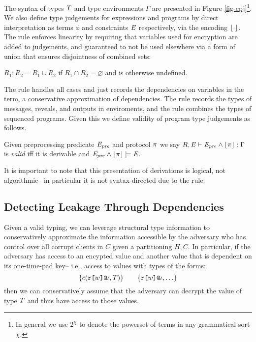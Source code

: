 \cpjfig

The syntax of types $T$ and type environments $\Gamma$ are presented
in Figure \ref{fig-cpj}\footnote{In general we use $2^{\chi}$ to
denote the powerset of terms in any grammatical sort $\chi$.}. We also
define type judgements for expressions and programs by direct
interpretation as terms $\phi$ and constraints $\mathit{E}$ respectively,
via the encoding $\lfloor \cdot \rfloor$. The  rule enforces
linearity by requiring that variables used for encryption are added to
judgements, and guaranteed to not be used elsewhere via a form of
union that ensures disjointness of combined sets:
\begin{definition}
  $R_1;R_2 = R_1 \cup R_2$ if $R_1 \cap R_2 = \varnothing$ and is otherwise
  undefined.
\end{definition}
The  rule handles all cases and just records the
dependencies on variables in the term, a conservative approximation of
dependencies.  The  rule records the types of messages,
reveals, and outputs in enviroments, and the  rule
combines the types of sequenced programs.  Given this we define
validity of program type judgements as follows.
\begin{definition}
  Given preprocessing predicate $\mathit{E}_{\mathit{pre}}$ and protocol $\pi$ we say
  $R,\mathit{E} \vdash \mathit{E}_{\mathit{pre}} \wedge \lfloor \pi \rfloor : \Gamma$ is \emph{valid} iff it is derivable and
  $\mathit{E}_{\mathit{pre}} \wedge \lfloor \pi \rfloor \models \mathit{E}$.
\end{definition}
It is important to note that this presentation of derivations is
logical, not algorithmic-- in particular it is not syntax-directed
due to the  rule.

\subsection{Detecting Leakage Through Dependencies}

Given a valid typing, we can leverage structural type information to
conservatively approximate the information accessible by the
adversary who has control over all corrupt clients in $C$ given
a partitioning $H,C$. In particular, if the adversary has access to an
encypted value and another value that is dependent on its one-time-pad
key-- i.e., access to values with types of the forms:
$$
\{ c(\texttt{r[}w\texttt{]}\texttt{@}\iota,T) \} \qquad \{ \texttt{r[}w\texttt{]}\texttt{@}\iota, \ldots \} 
$$
then we can conservatively assume that the adversary can decrypt the
value of type $T$ and thus have access to those values.

